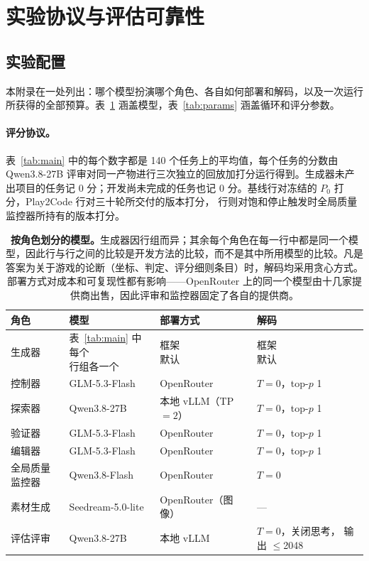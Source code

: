 \section{实验协议与评估可靠性}\label{app:exp}
\subsection{实验配置}\label{app:config}
本附录在一处列出：哪个模型扮演哪个角色、各自如何部署和解码，以及一次运行所获得的全部预算。表~\ref{tab:models} 涵盖模型，表~\ref{tab:params} 涵盖循环和评分参数。

\paragraph{评分协议。}表~\ref{tab:main} 中的每个数字都是 140 个任务上的平均值，每个任务的分数由 Qwen3.8-27B 评审对同一产物进行三次独立的回放加打分运行得到。生成器未产出项目的任务记 0 分；开发尚未完成的任务也记 0 分。基线行对冻结的 $P_0$ 打分，Play2Code 行对三十轮所交付的版本打分，\rsig{} 行则对饱和停止触发时全局质量监控器所持有的版本打分。

\begin{table}[htbp]
\caption{\textbf{按角色划分的模型。}生成器因行组而异；其余每个角色在每一行中都是同一个模型，因此行与行之间的比较是开发方法的比较，而不是其中所用模型的比较。凡是答案为关于游戏的论断（坐标、判定、评分细则条目）时，解码均采用贪心方式。部署方式对成本和可复现性都有影响——OpenRouter 上的同一个模型由十几家提供商出售，因此评审和监控器固定了各自的提供商。}
\label{tab:models}
\centering\small
\begin{tabular}{@{}llll@{}}
\toprule
角色 & 模型 & 部署方式 & 解码 \\
\midrule
生成器 & \makecell[l]{表~\ref{tab:main} 中每个\\行组各一个} & \makecell[l]{框架\\默认} & \makecell[l]{框架\\默认} \\
控制器 & GLM-5.3-Flash & OpenRouter & $T=0$，top-$p$ 1 \\
探索器 & Qwen3.8-27B & 本地 vLLM（TP $=2$） & $T=0$，top-$p$ 1 \\
验证器 & GLM-5.3-Flash & OpenRouter & $T=0$，top-$p$ 1 \\
编辑器 & GLM-5.3-Flash & OpenRouter & $T=0$，top-$p$ 1 \\
全局质量监控器 & Qwen3.8-Flash & OpenRouter & $T=0$ \\
素材生成 & Seedream-5.0-lite & OpenRouter（图像） & — \\
评估评审 & Qwen3.8-27B & 本地 vLLM & \makecell[l]{$T=0$，关闭思考，\\输出 $\leq$2048} \\
\bottomrule
\end{tabular}
\end{table}

